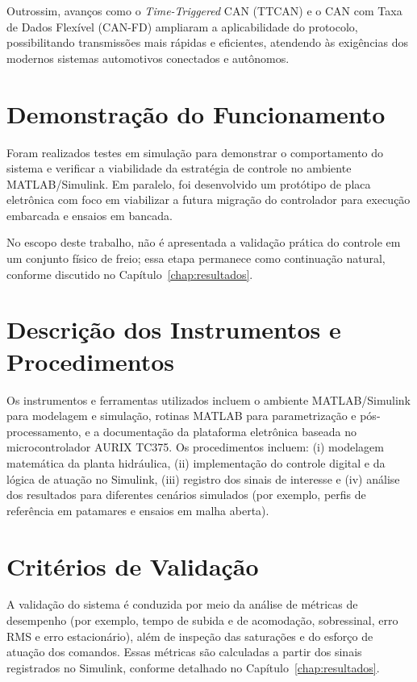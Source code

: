  Outrossim, avanços como o \textit{Time-Triggered} CAN (TTCAN) e o CAN com Taxa de Dados Flexível (CAN-FD) ampliaram a aplicabilidade do protocolo, possibilitando transmissões mais rápidas e eficientes, atendendo às exigências dos modernos sistemas automotivos conectados e autônomos.

\section{Demonstração do Funcionamento}
\label{sec:metodologia-7}
Foram realizados testes em simulação para demonstrar o comportamento do sistema e verificar a viabilidade da estratégia de controle no ambiente MATLAB/Simulink. Em paralelo, foi desenvolvido um protótipo de placa eletrônica com foco em viabilizar a futura migração do controlador para execução embarcada e ensaios em bancada.

No escopo deste trabalho, não é apresentada a validação prática do controle em um conjunto físico de freio; essa etapa permanece como continuação natural, conforme discutido no Capítulo~\ref{chap:resultados}.

\section{Descrição dos Instrumentos e Procedimentos}
\label{sec:metodologia-8}
Os instrumentos e ferramentas utilizados incluem o ambiente MATLAB/Simulink para modelagem e simulação, rotinas MATLAB para parametrização e pós-processamento, e a documentação da plataforma eletrônica baseada no microcontrolador AURIX TC375. Os procedimentos incluem: (i) modelagem matemática da planta hidráulica, (ii) implementação do controle digital e da lógica de atuação no Simulink, (iii) registro dos sinais de interesse e (iv) análise dos resultados para diferentes cenários simulados (por exemplo, perfis de referência em patamares e ensaios em malha aberta).

\section{Critérios de Validação}
\label{sec:metodologia-9}
A validação do sistema é conduzida por meio da análise de métricas de desempenho (por exemplo, tempo de subida e de acomodação, sobressinal, erro RMS e erro estacionário), além de inspeção das saturações e do esforço de atuação dos comandos. Essas métricas são calculadas a partir dos sinais registrados no Simulink, conforme detalhado no Capítulo~\ref{chap:resultados}.

